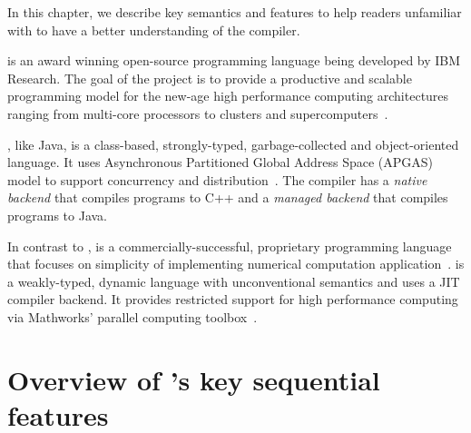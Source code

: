 
In this chapter, we describe key \xten semantics and features to help readers 
unfamiliar with \xten to
have a better understanding of the \mixten compiler.   

\xten is an award winning open-source programming language being developed by
IBM Research. The goal of the \xten project is to provide a productive and
scalable programming model for the new-age high performance computing
architectures ranging from multi-core processors to clusters and
supercomputers~\cite{x10}. 

\xten, like Java, is a class-based, strongly-typed, garbage-collected and
object-oriented language. It uses Asynchronous Partitioned Global Address 
Space (APGAS)
model to support concurrency and distribution~\cite{specs}. The \xten compiler has a
\emph{native backend} that compiles \xten programs to C++ and a 
\emph{managed backend} that
compiles \xten programs to Java. 

In contrast to \xten, \matlab is a commercially-successful, proprietary
programming language that focuses on simplicity of implementing numerical
computation application~\cite{MatlabGrowth}. \matlab is a weakly-typed, dynamic language
with unconventional semantics and uses a JIT compiler backend.
It provides restricted support for high performance
computing via Mathworks' parallel computing toolbox~\cite{pct}. 

\section{Overview of \xten's key sequential features}

